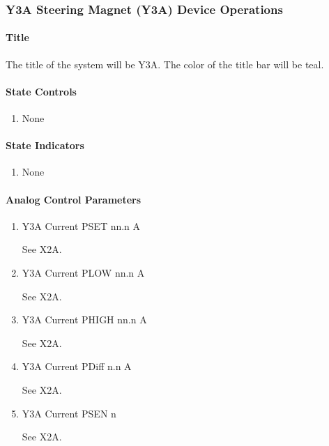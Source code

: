 \documentclass[11pt]{book}		%
\begin{document}
\subsubsection{Y3A Steering Magnet (Y3A) Device Operations} \label{sect:cyc-op-interface-ops-terminal-device-ops-y3a}

\paragraph{Title} \label{sect:cyc-op-interface-ops-terminal-device-ops-y3a-title}

The title of the system will be Y3A.  The color of the title bar will be teal.

\paragraph{State Controls}

\begin{enumerate}
\item None
\end{enumerate}

\paragraph{State Indicators}

\begin{enumerate}
 \item None
\end{enumerate}

\paragraph{Analog Control Parameters}

\begin{enumerate}
 \item Y3A Current PSET   nn.n A

\color{red}
See X2A.
\color{black}

 \item Y3A Current PLOW   nn.n A

\color{red}
See X2A.
\color{black}

 \item Y3A Current PHIGH  nn.n A

\color{red}
See X2A.
\color{black}

 \item Y3A Current PDiff n.n A

\color{red}
See X2A.
\color{black}

 \item Y3A Current PSEN  n

\color{red}
See X2A.
\color{black}

\end{enumerate}
\end{document}
